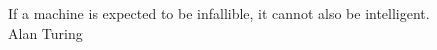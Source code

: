 
\cleardoublepage
{}
\thispagestyle{empty}

\vspace*{3cm}

\begin{center}
  If a machine is expected to be infallible, it cannot also be intelligent. \\ \medskip
  Alan Turing
\end{center}

\medskip

